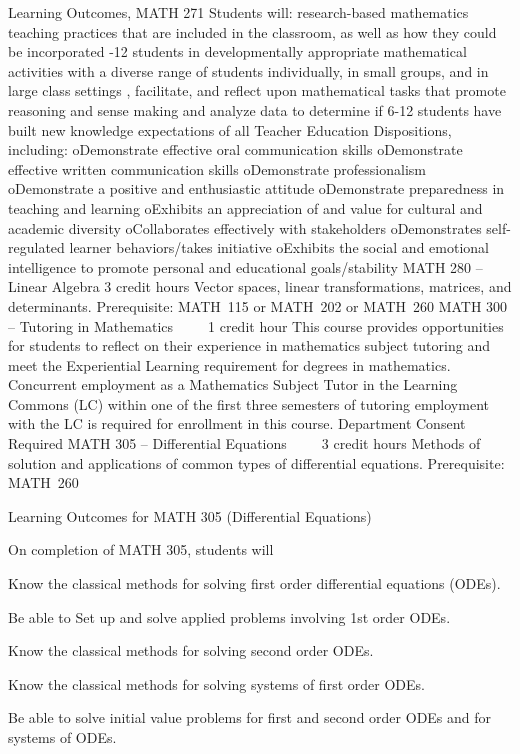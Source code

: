Learning Outcomes, MATH 271
Students will:
\itemIdentify research-based mathematics teaching practices that are included in the classroom, as well as how they could be incorporated
-12 students in developmentally appropriate mathematical activities 
\itemWork with a diverse range of students individually, in small groups, and in large class settings
\itemPlan, facilitate, and reflect upon mathematical tasks that promote reasoning and sense making
\itemCollect and analyze data to determine if 6-12 students have built new knowledge 
\itemMeet expectations of all Teacher Education Dispositions, including:
oDemonstrate effective oral communication skills
oDemonstrate effective written communication skills
oDemonstrate professionalism
oDemonstrate a positive and enthusiastic attitude
oDemonstrate preparedness in teaching and learning
oExhibits an appreciation of and value for cultural and academic diversity
oCollaborates effectively with stakeholders
oDemonstrates self-regulated learner behaviors/takes initiative
oExhibits the social and emotional intelligence to promote personal and educational goals/stability
MATH 280 – Linear Algebra 3 credit hours
Vector spaces, linear transformations, matrices, and determinants.
Prerequisite: MATH 115 or MATH 202 or MATH 260
MATH 300 – Tutoring in Mathematics     1 credit hour
This course provides opportunities for students to reflect on their experience in mathematics subject tutoring and meet the Experiential Learning requirement for degrees in mathematics. Concurrent employment as a Mathematics Subject Tutor in the Learning Commons (LC) within one of the first three semesters of tutoring employment with the LC is required for enrollment in this course.
Department Consent Required
MATH 305 – Differential Equations     3 credit hours
Methods of solution and applications of common types of differential equations.
Prerequisite: MATH 260

Learning Outcomes for MATH 305 (Differential Equations)

On completion of MATH 305, students will 
    \item Know the classical methods for solving first order differential equations (ODEs).
    \item Be able to Set up and solve applied problems involving 1st order ODEs.
    \item Know the classical methods for solving second order ODEs.
    \item Know the classical methods for solving systems of first order ODEs.
    \item Be able to solve initial value problems for first and second order ODEs and for systems of ODEs.

